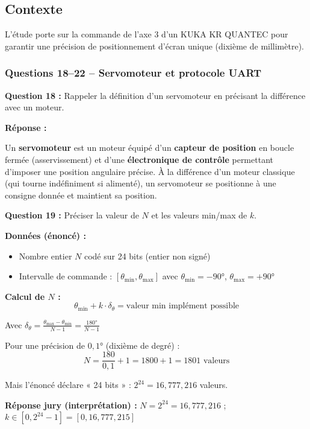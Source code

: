 \documentclass[12pt,a4paper,twoside]{article}
\begin{document}
\subsection*{Contexte}
L'étude porte sur la commande de l'axe 3 d'un KUKA KR QUANTEC pour garantir une précision de positionnement d'écran unique (dixième de millimètre).

\subsubsection{Questions 18--22 -- Servomoteur et protocole UART}

\begin{correction}
  \textbf{Question 18 :} Rappeler la définition d'un servomoteur en précisant la différence avec un moteur.

  \textbf{Réponse :}

  Un \textbf{servomoteur} est un moteur équipé d'un \textbf{capteur de position} en boucle fermée (asservissement) et d'une \textbf{électronique de contrôle} permettant d'imposer une position angulaire précise. À la différence d'un moteur classique (qui tourne indéfiniment si alimenté), un servomoteur se positionne à une consigne donnée et maintient sa position.

  \textbf{Question 19 :} Préciser la valeur de $N$ et les valeurs min/max de $k$.

  \textbf{Données (énoncé) :}
  \begin{itemize}
    \item Nombre entier $N$ codé sur 24 bits (entier non signé)
    \item Intervalle de commande : $[\theta_{\min}, \theta_{\max}]$ avec $\theta_{\min} = -90°$, $\theta_{\max} = +90°$
  \end{itemize}

  \textbf{Calcul de $N$ :}
  \[
    \theta_{\min} + k \cdot \delta_\theta = \text{valeur min implément possible}
  \]

  Avec $\delta_\theta = \frac{\theta_{\max} - \theta_{\min}}{N-1} = \frac{180°}{N-1}$

  Pour une précision de $0,1°$ (dixième de degré) :
  \[
    N = \frac{180}{0,1} + 1 = 1800 + 1 = 1801 \text{ valeurs}
  \]

  Mais l'énoncé déclare « 24 bits » : $2^{24} = 16{,}777{,}216$ valeurs.

  \textbf{Réponse jury (interprétation) :} $N = 2^{24} = 16{,}777{,}216$ ; $k \in [0, 2^{24}-1] = [0, 16{,}777{,}215]$


\end{correction}
\end{document}

